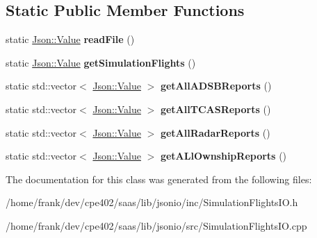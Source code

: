 \subsection*{Static Public Member Functions}
\begin{DoxyCompactItemize}
\item 
\hypertarget{class_simulation_flights_i_o_a94216ff482f30e981ecdcfe6b60b32e1}{}static \hyperlink{class_json_1_1_value}{Json\+::\+Value} {\bfseries read\+File} ()\label{class_simulation_flights_i_o_a94216ff482f30e981ecdcfe6b60b32e1}

\item 
\hypertarget{class_simulation_flights_i_o_a6f7ccb43c03b884d2f2e9626388eafb3}{}static \hyperlink{class_json_1_1_value}{Json\+::\+Value} {\bfseries get\+Simulation\+Flights} ()\label{class_simulation_flights_i_o_a6f7ccb43c03b884d2f2e9626388eafb3}

\item 
\hypertarget{class_simulation_flights_i_o_a547b6678fe198a55d6a6b4ff9b41219a}{}static std\+::vector$<$ \hyperlink{class_json_1_1_value}{Json\+::\+Value} $>$ {\bfseries get\+All\+A\+D\+S\+B\+Reports} ()\label{class_simulation_flights_i_o_a547b6678fe198a55d6a6b4ff9b41219a}

\item 
\hypertarget{class_simulation_flights_i_o_a7bcaa781177cdd7af4b20cd2bc30a205}{}static std\+::vector$<$ \hyperlink{class_json_1_1_value}{Json\+::\+Value} $>$ {\bfseries get\+All\+T\+C\+A\+S\+Reports} ()\label{class_simulation_flights_i_o_a7bcaa781177cdd7af4b20cd2bc30a205}

\item 
\hypertarget{class_simulation_flights_i_o_a3d0eced277e173d340808665c2e0edfa}{}static std\+::vector$<$ \hyperlink{class_json_1_1_value}{Json\+::\+Value} $>$ {\bfseries get\+All\+Radar\+Reports} ()\label{class_simulation_flights_i_o_a3d0eced277e173d340808665c2e0edfa}

\item 
\hypertarget{class_simulation_flights_i_o_a60542714b7bf8d2f8ce4cb335350f05d}{}static std\+::vector$<$ \hyperlink{class_json_1_1_value}{Json\+::\+Value} $>$ {\bfseries get\+A\+Ll\+Ownship\+Reports} ()\label{class_simulation_flights_i_o_a60542714b7bf8d2f8ce4cb335350f05d}

\end{DoxyCompactItemize}


The documentation for this class was generated from the following files\+:\begin{DoxyCompactItemize}
\item 
/home/frank/dev/cpe402/saas/lib/jsonio/inc/Simulation\+Flights\+I\+O.\+h\item 
/home/frank/dev/cpe402/saas/lib/jsonio/src/Simulation\+Flights\+I\+O.\+cpp\end{DoxyCompactItemize}
